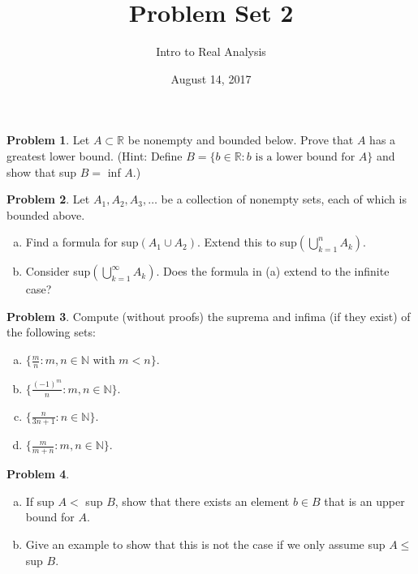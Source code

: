 \documentclass{amsart}
\newcommand{\+}[1]{\ensuremath{\mathbf{#1}}}
\newcommand{\R}{{\mathbb R}}
\theoremstyle{definition}
\newtheorem{prob}{Problem}
\begin{document}
\title{Problem Set 2}
\date{August 14, 2017}
\author{Intro to Real Analysis}

\maketitle


\begin{prob}
Let $A \subset \R$ be nonempty and bounded below.
Prove that $A$ has a greatest lower bound.
(Hint: Define $B = \{b \in \R: b \text{ is a lower
bound for } A\}$ and show that sup $B =$ inf $A$.)
\end{prob}

\begin{prob}
 Let $A_1, A_2, A_3, \ldots$ be a collection of 
 nonempty sets, each of which is bounded above.
 \begin{enumerate}[(a)]
  \item Find a formula for sup$(A_1 \cup A_2)$.
  Extend this to sup$(\bigcup^n_{k=1} A_k)$.
  \item Consider sup$(\bigcup^\infty_{k=1} A_k)$.
  Does the formula in (a) extend to the infinite case?
 \end{enumerate}
\end{prob}

\begin{prob}
 Compute (without proofs) the suprema and infima (if they exist)
 of the following sets:
 \begin{enumerate}[(a)]
  \item $\{\frac{m}{n}: m,n \in \mathbb{N} \text{ with } m < n\}$.
    \vspace{2mm}
  \item $\{\frac{(-1)^m}{n}: m,n \in \mathbb{N}\}$.
  \vspace{2mm}
  \item $\{\frac{n}{3n+1}: n \in \mathbb{N}\}$.
    \vspace{2mm}
  \item $\{\frac{m}{m+n}: m,n \in \mathbb{N}\}$.
 \end{enumerate}
\end{prob}

\begin{prob}
 \begin{enumerate}[(a)]
  \item If sup $A < $ sup $B$, show that there exists
  an element $b \in B$ that is an upper bound for $A$.
  \item Give an example to show that this is not the case
  if we only assume sup $A \leq$ sup $B$.
 \end{enumerate}
\end{prob}
\end{document}
